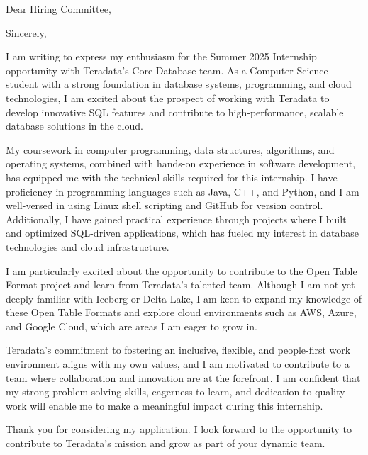 \documentclass[11pt,a4paper,roman]{moderncv}
\begin{document}
\date{\today}
\opening{Dear Hiring Committee,}
\closing{Sincerely,}
\makelettertitle
I am writing to express my enthusiasm for the Summer 2025 Internship opportunity with Teradata’s Core Database team. As a Computer Science student with a strong foundation in database systems, programming, and cloud technologies, I am excited about the prospect of working with Teradata to develop innovative SQL features and contribute to high-performance, scalable database solutions in the cloud.

My coursework in computer programming, data structures, algorithms, and operating systems, combined with hands-on experience in software development, has equipped me with the technical skills required for this internship. I have proficiency in programming languages such as Java, C++, and Python, and I am well-versed in using Linux shell scripting and GitHub for version control. Additionally, I have gained practical experience through projects where I built and optimized SQL-driven applications, which has fueled my interest in database technologies and cloud infrastructure.

I am particularly excited about the opportunity to contribute to the Open Table Format project and learn from Teradata's talented team. Although I am not yet deeply familiar with Iceberg or Delta Lake, I am keen to expand my knowledge of these Open Table Formats and explore cloud environments such as AWS, Azure, and Google Cloud, which are areas I am eager to grow in.

Teradata’s commitment to fostering an inclusive, flexible, and people-first work environment aligns with my own values, and I am motivated to contribute to a team where collaboration and innovation are at the forefront. I am confident that my strong problem-solving skills, eagerness to learn, and dedication to quality work will enable me to make a meaningful impact during this internship.

Thank you for considering my application. I look forward to the opportunity to contribute to Teradata’s mission and grow as part of your dynamic team.

\vspace{0.5cm}

\makeletterclosing
\end{document}
